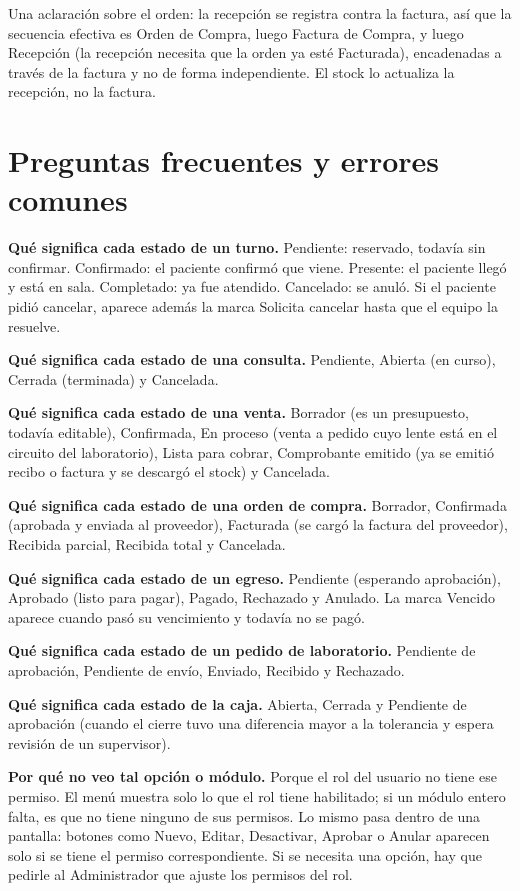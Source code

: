 Una aclaración sobre el orden: la recepción se registra contra la factura, así que la secuencia efectiva es Orden de Compra, luego Factura de Compra, y luego Recepción (la recepción necesita que la orden ya esté Facturada), encadenadas a través de la factura y no de forma independiente. El stock lo actualiza la recepción, no la factura.

\section{Preguntas frecuentes y errores comunes}
\label{sec:mu-faq}

\textbf{Qué significa cada estado de un turno.} Pendiente: reservado, todavía sin confirmar. Confirmado: el paciente confirmó que viene. Presente: el paciente llegó y está en sala. Completado: ya fue atendido. Cancelado: se anuló. Si el paciente pidió cancelar, aparece además la marca Solicita cancelar hasta que el equipo la resuelve.

\textbf{Qué significa cada estado de una consulta.} Pendiente, Abierta (en curso), Cerrada (terminada) y Cancelada.

\textbf{Qué significa cada estado de una venta.} Borrador (es un presupuesto, todavía editable), Confirmada, En proceso (venta a pedido cuyo lente está en el circuito del laboratorio), Lista para cobrar, Comprobante emitido (ya se emitió recibo o factura y se descargó el stock) y Cancelada.

\textbf{Qué significa cada estado de una orden de compra.} Borrador, Confirmada (aprobada y enviada al proveedor), Facturada (se cargó la factura del proveedor), Recibida parcial, Recibida total y Cancelada.

\textbf{Qué significa cada estado de un egreso.} Pendiente (esperando aprobación), Aprobado (listo para pagar), Pagado, Rechazado y Anulado. La marca Vencido aparece cuando pasó su vencimiento y todavía no se pagó.

\textbf{Qué significa cada estado de un pedido de laboratorio.} Pendiente de aprobación, Pendiente de envío, Enviado, Recibido y Rechazado.

\textbf{Qué significa cada estado de la caja.} Abierta, Cerrada y Pendiente de aprobación (cuando el cierre tuvo una diferencia mayor a la tolerancia y espera revisión de un supervisor).

\textbf{Por qué no veo tal opción o módulo.} Porque el rol del usuario no tiene ese permiso. El menú muestra solo lo que el rol tiene habilitado; si un módulo entero falta, es que no tiene ninguno de sus permisos. Lo mismo pasa dentro de una pantalla: botones como Nuevo, Editar, Desactivar, Aprobar o Anular aparecen solo si se tiene el permiso correspondiente. Si se necesita una opción, hay que pedirle al Administrador que ajuste los permisos del rol.

